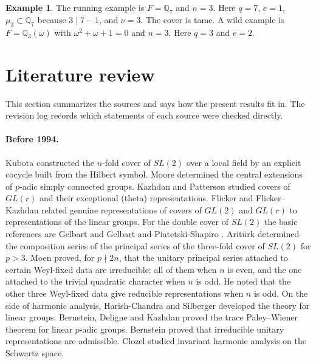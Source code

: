 \documentclass[12pt,letterpaper]{article}
\numberwithin{equation}{section}
\theoremstyle{definition}
\newtheorem{xexample}[theorem]{Example}
\newcommand{\Q}{\mathbb Q}
\begin{document}
\begin{xexample}\label{ex:Q7}
The running example is $F=\Q_7$ and $n=3$.  Here $q=7$, $e=1$, $\mu_3\subset\Q_7$ because
$3\mid 7-1$, and $\nu=3$.  The cover is tame.  A wild example is $F=\Q_3(\omega)$ with
$\omega^2+\omega+1=0$ and $n=3$.  Here $q=3$ and $e=2$.
\end{xexample}

\section*{Literature review}

This section summarizes the sources and says how the present results fit in.  The
revision log records which statements of each source were checked directly.

\paragraph{Before 1994.}
Kubota \cite{Ku67} constructed the $n$-fold cover of $SL(2)$ over a local field by an
explicit cocycle built from the Hilbert symbol.  Moore \cite{Mo68} determined the central
extensions of $p$-adic simply connected groups.  Kazhdan and Patterson \cite{KP84} studied
covers of $GL(r)$ and their exceptional (theta) representations.  Flicker \cite{Fl80} and
Flicker--Kazhdan \cite{FK86} related genuine representations of covers of $GL(2)$ and
$GL(r)$ to representations of the linear groups.  For the double cover of $SL(2)$ the
basic references are Gelbart \cite{Ge76} and Gelbart and Piatetski-Shapiro \cite{GPS83}.
Arit\"urk \cite{Ar80} determined the composition series of the principal series of the
three-fold cover of $SL(2)$ for $p>3$.  Moen \cite{Mo88} proved, for $p\nmid 2n$, that
the unitary principal series attached to certain Weyl-fixed data are irreducible: all of
them when $n$ is even, and the one attached to the trivial quadratic character when $n$
is odd.  He noted that the other three Weyl-fixed data give reducible representations
when $n$ is odd.  On the side of harmonic analysis, Harish-Chandra \cite{HC70} and
Silberger \cite{Si79} developed the theory for linear groups.  Bernstein, Deligne and
Kazhdan \cite{BDK86} proved the trace Paley--Wiener theorem for linear $p$-adic groups.
Bernstein \cite{Be74} proved that irreducible unitary representations are admissible.
Clozel \cite{Cl91} studied invariant harmonic analysis on the Schwartz space.
\end{document}
